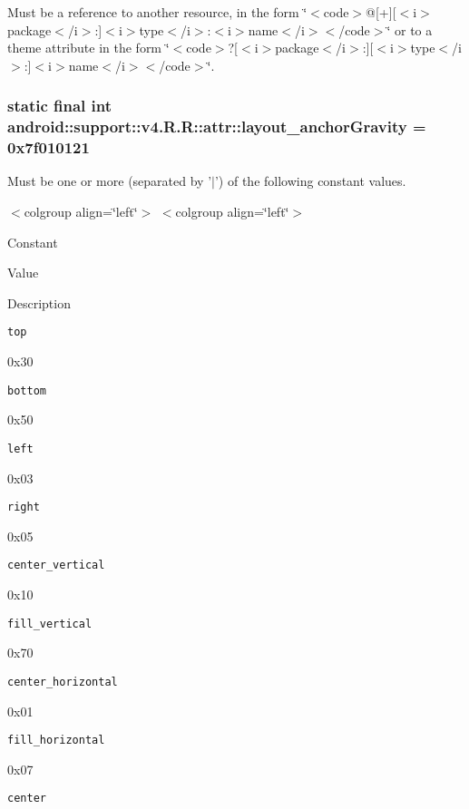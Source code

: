 Must be a reference to another resource, in the form \char`\"{}$<$code$>$@\mbox{[}+\mbox{]}\mbox{[}$<$i$>$package$<$/i$>$:\mbox{]}$<$i$>$type$<$/i$>$:$<$i$>$name$<$/i$>$$<$/code$>$\char`\"{} or to a theme attribute in the form \char`\"{}$<$code$>$?\mbox{[}$<$i$>$package$<$/i$>$:\mbox{]}\mbox{[}$<$i$>$type$<$/i$>$:\mbox{]}$<$i$>$name$<$/i$>$$<$/code$>$\char`\"{}. \hypertarget{classandroid_1_1support_1_1v4_1_1_r_1_1attr_a685bd7611f74a5280bd7de1c81ae326}{
\subsubsection[{layout\_\-anchorGravity}]{\setlength{\rightskip}{0pt plus 5cm}static final int android::support::v4.R.R::attr::layout\_\-anchorGravity = 0x7f010121}}
\label{classandroid_1_1support_1_1v4_1_1_r_1_1attr_a685bd7611f74a5280bd7de1c81ae326}


Must be one or more (separated by '$|$') of the following constant values. \begin{TabularC}{0}
\hline
\end{TabularC}
$<$colgroup align=\char`\"{}left\char`\"{}$>$ $<$colgroup align=\char`\"{}left\char`\"{}$>$ 

Constant

Value

Description 

{\tt top}

0x30

{\tt bottom}

0x50

{\tt left}

0x03

{\tt right}

0x05

{\tt center\_\-vertical}

0x10

{\tt fill\_\-vertical}

0x70

{\tt center\_\-horizontal}

0x01

{\tt fill\_\-horizontal}

0x07

{\tt center}


